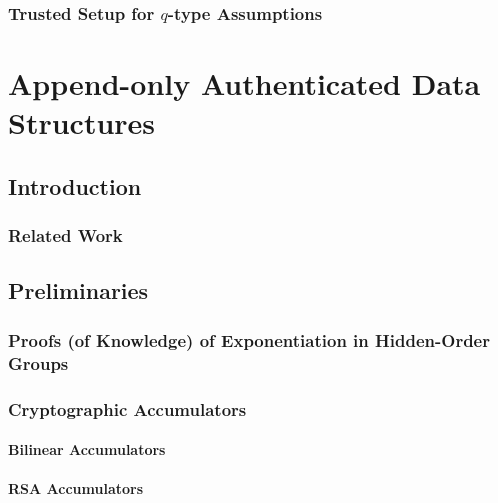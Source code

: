 \documentclass[12pt,twoside,singlespace]{mitthesis}
\begin{document}
        \section{Trusted Setup for $q$-type Assumptions}
        \label{s:prelim:trusted-setup}
        

%
%
\cleardoublepage
\part{Append-only Authenticated Data Structures}
\label{s:aads}
    
    \chapter{Introduction}
    \label{s:aads:intro}
    
    
        \section{Related Work}
        \label{s:aads:related-work}
        

    \chapter{Preliminaries}
    \label{s:prelim:aads}
        
        
        \section{Proofs (of Knowledge) of Exponentiation in Hidden-Order Groups}
        \label{s:prelim:poke-hidden-order}
        
        
        \section{Cryptographic Accumulators}
        \label{s:prelim:acc}
        
        
            \subsection{Bilinear Accumulators}
            \label{s:prelim:bilinear-acc}
            
    
            \subsection{RSA Accumulators}
            \label{s:prelim:rsa-acc}
            
            
\end{document}
